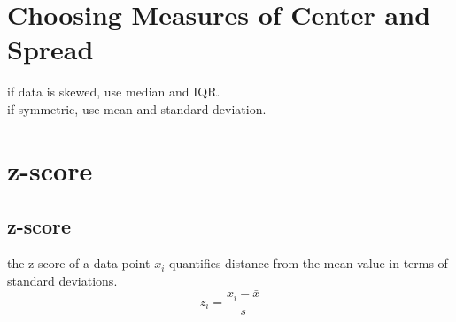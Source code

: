 	\section{Choosing Measures of Center and Spread}
	if data is skewed, use median and IQR.\\
	if symmetric, use mean and standard deviation.

	\section{z-score}
        \subsection{z-score}
        the z-score of a data point $x_i$ quantifies distance from the mean value in terms of standard deviations.
        \begin{equation}z_i=\frac{x_i-\bar{x}}{s}\end{equation} 
